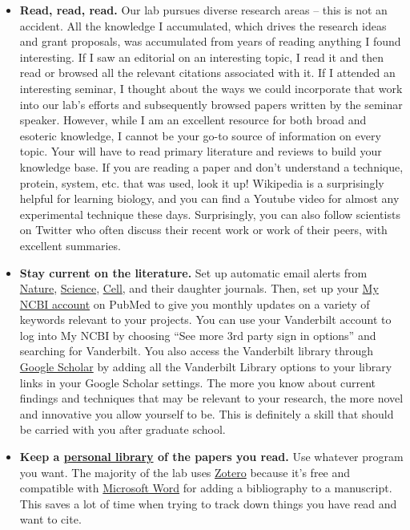 \documentclass[
]{book}
\begin{document}
\begin{itemize}
\item
  \textbf{Read, read, read.} Our lab pursues diverse research areas -- this is not an accident. All the knowledge I accumulated, which drives the research ideas and grant proposals, was accumulated from years of reading anything I found interesting. If I saw an editorial on an interesting topic, I read it and then read or browsed all the relevant citations associated with it. If I attended an interesting seminar, I thought about the ways we could incorporate that work into our lab's efforts and subsequently browsed papers written by the seminar speaker. However, while I am an excellent resource for both broad and esoteric knowledge, I cannot be your go-to source of information on every topic. Your will have to read primary literature and reviews to build your knowledge base. If you are reading a paper and don't understand a technique, protein, system, etc. that was used, look it up! Wikipedia is a surprisingly helpful for learning biology, and you can find a Youtube video for almost any experimental technique these days. Surprisingly, you can also follow scientists on Twitter who often discuss their recent work or work of their peers, with excellent summaries.
\item
  \textbf{Stay current on the literature.} Set up automatic email alerts from \href{https://www.nature.com/}{Nature}, \href{https://www.sciencemag.org/}{Science}, \href{https://www.cell.com/}{Cell}, and their daughter journals. Then, set up your \href{https://www.ncbi.nlm.nih.gov/myncbi/}{My NCBI account} on PubMed to give you monthly updates on a variety of keywords relevant to your projects. You can use your Vanderbilt account to log into My NCBI by choosing ``See more 3rd party sign in options'' and searching for Vanderbilt. You also access the Vanderbilt library through \href{https://scholar.google.com/}{Google Scholar} by adding all the Vanderbilt Library options to your library links in your Google Scholar settings. The more you know about current findings and techniques that may be relevant to your research, the more novel and innovative you allow yourself to be. This is definitely a skill that should be carried with you after graduate school.
\item
  \textbf{Keep a \protect\hyperlink{zotero}{personal library} of the papers you read.} Use whatever program you want. The majority of the lab uses \href{https://www.zotero.org/}{Zotero} because it's free and compatible with \href{https://www.zotero.org/support/word_processor_integration}{Microsoft Word} for adding a bibliography to a manuscript. This saves a lot of time when trying to track down things you have read and want to cite.

\end{itemize}
\end{document}
